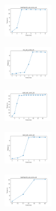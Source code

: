 \begin{figure}[H]
\begin{subfigure}
    \end{subfigure}
    \hfill
    \begin{subfigure}
        \centering
        \includegraphics[width=0.234\textwidth]{img/es/newthyroid_set_const_20_277451237_time.png}
    \end{subfigure}
    \hfill
    \begin{subfigure}
        \centering
        \includegraphics[width=0.234\textwidth]{img/es/iris_set_const_20_49258669_time.png}
    \end{subfigure}
    \hfill
    \begin{subfigure}
        \centering
        \includegraphics[width=0.234\textwidth]{img/es/ecoli_set_const_20_49258669_time.png}
    \end{subfigure}
    \hfill
    \begin{subfigure}
        \centering
        \includegraphics[width=0.234\textwidth]{img/es/rand_set_const_20_49258669_time.png}
    \end{subfigure}
    \hfill
    \begin{subfigure}
        \centering
        \includegraphics[width=0.234\textwidth]{img/es/newthyroid_set_const_20_49258669_time.png}
    \end{subfigure}
    \hfill
    \begin{subfigure}

\end{subfigure}
\end{figure}
